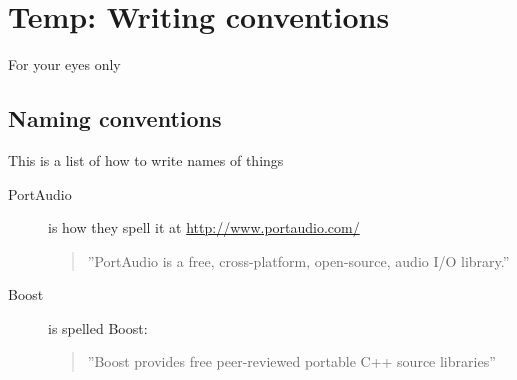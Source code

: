 \chapter*{Temp: Writing conventions}
For your eyes only
\section*{Naming conventions}
This is a list of how to write names of things

\begin{description}
  \item[PortAudio] is how they spell it at \url{http://www.portaudio.com/} \begin{quote}''PortAudio is a free, cross-platform, open-source, audio I/O library.''\end{quote}
  \item[Boost] is spelled Boost: \begin{quote}''Boost provides free peer-reviewed portable C++ source libraries''\end{quote}
\end{description}
